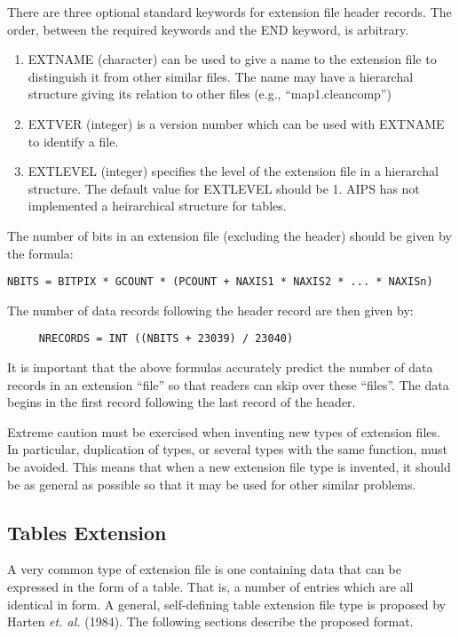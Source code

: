 There are three optional standard keywords for extension file header
records.  The order, between the required keywords and the END
keyword, is arbitrary.
\begin{enumerate} %
\item EXTNAME (character) can be used to give a name to the extension file
to distinguish it from other similar files.  The name may have a
hierarchal structure giving its relation to other files (e.g.,
``map1.cleancomp'')
\item EXTVER (integer) is a version number which can be used with EXTNAME to
identify a file.
\item EXTLEVEL (integer) specifies the level of the extension file in a
hierarchal structure.  The default value for EXTLEVEL should be 1.
AIPS has not implemented a heirarchical structure for tables.
\end{enumerate} %
The number of bits in an extension file (excluding the header) should
be given by the formula:

\begin{verbatim}
NBITS = BITPIX * GCOUNT * (PCOUNT + NAXIS1 * NAXIS2 * ... * NAXISn)

\end{verbatim}
The number of data records following the header record are then given
by:

\begin{verbatim}
     NRECORDS = INT ((NBITS + 23039) / 23040)

\end{verbatim}
It is important that the above formulas accurately predict the number
of data records in an extension ``file'' so that readers can skip over
these ``files''.  The data begins in the first record following the last
record of the header.

Extreme caution must be exercised when inventing new types of
extension files.  In particular, duplication of types, or several
types with the same function, must be avoided.  This means that when a
new extension file type is invented, it should be as general as
possible so that it may be used for other similar problems.

\subsection{Tables Extension }
A very common type of extension file is one containing data that can
be expressed in the form of a table.  That is, a number of entries
which are all identical in form.  A general, self-defining table
extension file type is proposed by Harten {\it et. al.} (1984). The
following sections describe the proposed format.

